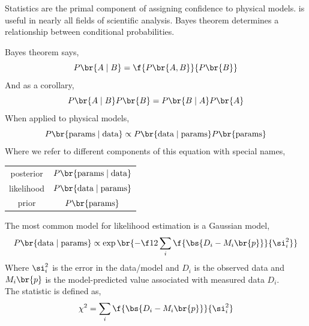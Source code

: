 \documentclass{article}
\begin{document}
Statistics are the primal component of assigning confidence to physical models.  is useful in nearly all fields of scientific analysis. Bayes theorem determines a relationship between conditional probabilities.

\begin{center}
\end{center}

Bayes theorem says,
\[ P\br{A \mid B} = \f{P\br{A,B}}{P\br{B}} \]
And as a corollary,
\[ P\br{A \mid B} P\br{B} = P\br{B \mid A}P\br{A} \]
When applied to physical models,
\[ P\br{\text{params}\mid\text{data}}\propto P\br{\text{data}\mid\text{params}}P\br{\text{params}} \]
Where we refer to different components of this equation with special names,
\begin{center}
    \begin{tabular}{cc}
        posterior & $P\br{\text{params}\mid\text{data}}$ \\
        likelihood & $P\br{\text{data}\mid\text{params}}$ \\
        prior & $P\br{\text{params}}$ \\
    \end{tabular}
\end{center}

The most common model for likelihood estimation is a Gaussian model,
\[ P\br{\text{data}\mid\text{params}} \propto \exp\br{-\f12 \sum_i \f{\bs{D_i - M_i\br{p}}}{\si_i^2}} \]
Where $\si_i^2$ is the error in the data/model and $D_i$ is the observed data and $M_i\br{p}$ is the model-predicted value associated with measured data $D_i$.\\

The  statistic is defined as,
\[ \chi^2 = \sum_i \f{\bs{D_i - M_i\br{p}}}{\si_i^2} \]
\end{document}
